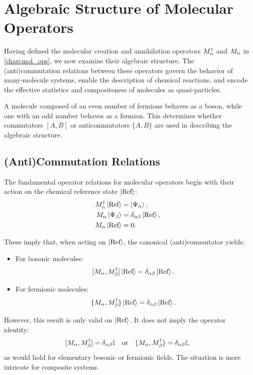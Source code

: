 
\chapter{Algebraic Structure of Molecular Operators}
\label{chap:algebra}

Having defined the molecular creation and annihilation operators \(M^\dagger_{\alpha}\) and \(M_{\alpha}\) in \cref{chap:mol_ops}, we now examine their algebraic structure. The (anti)commutation relations between these operators govern the behavior of many-molecule systems, enable the description of chemical reactions, and encode the effective statistics and compositeness of molecules as quasi-particles.

A molecule composed of an even number of fermions behaves as a boson, while one with an odd number behaves as a fermion. This determines whether commutators \([A,B]\) or anticommutators \(\{A,B\}\) are used in describing the algebraic structure.

\section{(Anti)Commutation Relations}
\label{sec:algebra_commutation}

The fundamental operator relations for molecular operators begin with their action on the chemical reference state \(\ket{\text{Ref}}\):
\begin{align}
	M^\dagger_{\alpha} \ket{\text{Ref}} &= \ket{\Psi_\alpha}, \label{eq:mdag_action_recall} \\
	M_{\alpha} \ket{\Psi_\beta} &= \delta_{\alpha\beta} \ket{\text{Ref}}, \label{eq:m_op_action_recall} \\
	M_{\alpha} \ket{\text{Ref}} &= 0. \label{eq:m_op_on_ref}
\end{align}

These imply that, when acting on \(\ket{\text{Ref}}\), the canonical (anti)commutator yields:
\begin{itemize}
	\item For bosonic molecules:
	\[
	[M_{\alpha}, M^\dagger_{\beta}] \ket{\text{Ref}} = \delta_{\alpha\beta} \ket{\text{Ref}}.
	\]
	\item For fermionic molecules:
	\[
	\{M_{\alpha}, M^\dagger_{\beta}\} \ket{\text{Ref}} = \delta_{\alpha\beta} \ket{\text{Ref}}.
	\]
\end{itemize}

However, this result is only valid on \(\ket{\text{Ref}}\). It does not imply the operator identity:
\[
[M_{\alpha}, M^\dagger_{\beta}] = \delta_{\alpha\beta} \mathbb{I}
\quad \text{or} \quad
\{M_{\alpha}, M^\dagger_{\beta}\} = \delta_{\alpha\beta} \mathbb{I},
\]
as would hold for elementary bosonic or fermionic fields. The situation is more intricate for composite systems.


